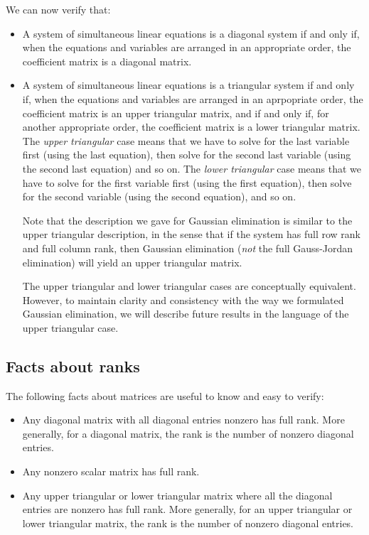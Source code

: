 \documentclass[10pt]{amsart}
\begin{document}
We can now verify that:

\begin{itemize}
\item A system of simultaneous linear equations is a diagonal system
  if and only if, when the equations and variables are arranged in an
  appropriate order, the coefficient matrix is a diagonal matrix.
\item A system of simultaneous linear equations is a triangular system
  if and only if, when the equations and variables are arranged in an
  aprpopriate order, the coefficient matrix is an upper triangular
  matrix, and if and only if, for another appropriate order, the
  coefficient matrix is a lower triangular matrix. The {\em upper
    triangular} case means that we have to solve for the last variable
  first (using the last equation), then solve for the second last
  variable (using the second last equation) and so on. The {\em lower
    triangular} case means that we have to solve for the first
  variable first (using the first equation), then solve for the second
  variable (using the second equation), and so on.

  Note that the description we gave for Gaussian elimination is
  similar to the upper triangular description, in the sense that if
  the system has full row rank and full column rank, then Gaussian
  elimination ({\em not} the full Gauss-Jordan elimination) will yield
  an upper triangular matrix.

  The upper triangular and lower triangular cases are conceptually
  equivalent. However, to maintain clarity and consistency with the
  way we formulated Gaussian elimination, we will describe future
  results in the language of the upper triangular case.
\end{itemize}

\subsection{Facts about ranks}

The following facts about matrices are useful to know and easy to verify:

\begin{itemize}
\item Any diagonal matrix with all diagonal entries nonzero has full
  rank. More generally, for a diagonal matrix, the rank is the number
  of nonzero diagonal entries.
\item Any nonzero scalar matrix has full rank.
\item Any upper triangular or lower triangular matrix where all the
  diagonal entries are nonzero has full rank. More generally, for an
  upper triangular or lower triangular matrix, the rank is the number
  of nonzero diagonal entries.
\end{itemize}
\end{document}

